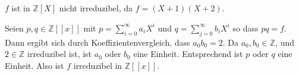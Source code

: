 \documentclass[a4paper,10pt]{article}
\newcommand{\Z}{\mathbb{Z}}
\begin{document}
\subsection{}
$f$ ist in $\Z[X]$ nicht irreduzibel, da $f = (X+1)(X+2)$.

Seien $p,q \in \Z[\![x]\!]$ mit $p = \sum_{i=0}^\infty a_i X^i$ und $q = \sum_{j=0}^\infty b_i X^i$ so dass $pq = f$. Dann ergibt sich durch Koeffizientenvergleich, dass $a_0 b_0 = 2$. Da $a_0, b_0 \in \Z$, und $2 \in \Z$ irreduzibel ist, ist $a_0$ oder $b_0$ eine Einheit. Entsprechend ist $p$ oder $q$ eine Einheit. Also ist $f$ irreduzibel in $\Z[\![x]\!]$.
\end{document}
